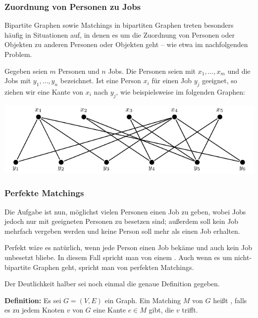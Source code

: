 \documentclass[smaller]{beamer}
\begin{document}
\begin{frame}
 \frametitle{Zuordnung von Personen zu Jobs}
 Bipartite Graphen sowie Matchings in bipartiten Graphen treten besonders häufig in Situationen auf, in denen es um die Zuordnung von Personen oder Objekten zu anderen Personen oder Objekten geht -- wie etwa im nachfolgenden Problem. \\ \vspace*{0.2cm}

Gegeben seien $m$ Personen und $n$ Jobs. Die Personen seien mit $x_1,\ldots,x_m$ und die Jobs mit $y_1,\ldots,y_n$ bezeichnet. Ist eine Person $x_i$ für einen Job $y_j$ geeignet, so ziehen wir eine Kante von $x_i$ nach $y_j$, wie beispielsweise im folgenden Graphen:
\begin{center}
 \includegraphics{fig36.pdf}
\end{center}
\end{frame}

\begin{frame}
 \frametitle{Perfekte Matchings}
 Die Aufgabe ist nun, möglichst vielen Personen einen Job zu geben, wobei Jobs jedoch nur mit geeigneten Personen zu besetzen sind; außerdem soll kein Job mehrfach vergeben werden und keine Person soll mehr als einen Job erhalten. \\ \vspace*{0.2cm}

Perfekt wäre es natürlich, wenn jede Person einen Job bekäme und auch kein Job unbesetzt bliebe. In diesem Fall spricht man von einem . Auch wenn es um nicht-bipartite Graphen geht, spricht man von perfekten Matchings. \\ \vspace*{0.2cm}

Der Deutlichkeit halber sei noch einmal die genaue Definition gegeben. \\ \vspace*{0.2cm}

\textbf{Definition:} Es sei $G=(V,E)$ ein Graph. Ein Matching $M$ von $G$ heißt , falls es zu jedem Knoten $v$ von $G$ eine Kante $e \in M$ gibt, die $v$ trifft.
\end{frame}
\end{document}
